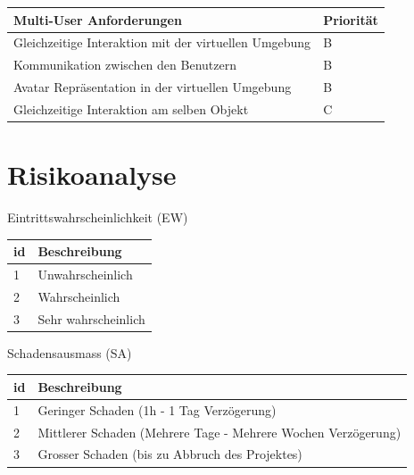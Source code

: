 \begin{center}
	\begin{tabular}	{ |l|l| }
		\hline
		\rowcolor{black}
		\color{white} \textbf{Multi-User Anforderungen} & \color{white} \textbf{Priorität} \\
		\hline
		Gleichzeitige Interaktion mit der virtuellen Umgebung & B \\
		\hline
		Kommunikation zwischen den Benutzern & B \\
		\hline
		Avatar Repräsentation in der virtuellen Umgebung & B \\
		\hline		
		Gleichzeitige Interaktion am selben Objekt & C \\
		\hline
	\end{tabular}
\end{center}
\label{tbl:multi_user_anforderungen}

\pagebreak
\section{Risikoanalyse}
Eintrittswahrscheinlichkeit (EW)
\begin{center}
	\begin{tabular}	{ |l|l| }
		\hline
		\rowcolor{black}
		\color{white} \textbf{id} & \color{white} \textbf{Beschreibung} \\
		\hline
		1 & Unwahrscheinlich \\
		\hline
		2 & Wahrscheinlich \\
		\hline
		3 & Sehr wahrscheinlich \\
		\hline
	\end{tabular}
\end{center}
\label{tbl:eintrittswahrscheinlichkeit}

\bigskip
Schadensausmass (SA)
\begin{center}
	\begin{tabular}	{ |l|l| }
		\hline
		\rowcolor{black}
		\color{white} \textbf{id} & \color{white} \textbf{Beschreibung} \\
		\hline
		1 & Geringer Schaden (1h - 1 Tag Verzögerung) \\
		\hline
		2 & Mittlerer Schaden (Mehrere Tage - Mehrere Wochen Verzögerung) \\
		\hline
		3 & Grosser Schaden (bis zu Abbruch des Projektes) \\
		\hline
	\end{tabular}
\end{center}
\label{tbl:schadensausmass}

